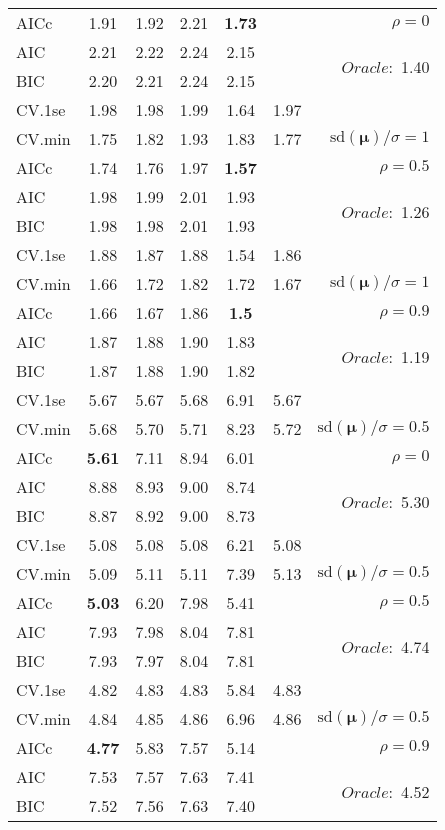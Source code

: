 \begin{table}
\begin{center}
\begin{tabular}{l*{5}{c}|r}
AICc & 1.91 & 1.92 & 2.21 & {\bf 1.73} & & $\rho=0$ \\
AIC & 2.21 & 2.22 & 2.24 & 2.15 & &  \multirow{2}{*}{$Oracle: $ 1.40} \\
BIC & 2.20 & 2.21 & 2.24 & 2.15 & &  \\
 \hline 
CV.1se & 1.98 & 1.98 & 1.99 & 1.64 & 1.97 & \\
CV.min & 1.75 & 1.82 & 1.93 & 1.83 & 1.77 &  $\mathrm{sd}(\mathbf{\mu})/\sigma=1$ \\
AICc & 1.74 & 1.76 & 1.97 & {\bf 1.57} & & $\rho=0.5$ \\
AIC & 1.98 & 1.99 & 2.01 & 1.93 & &  \multirow{2}{*}{$Oracle: $ 1.26} \\
BIC & 1.98 & 1.98 & 2.01 & 1.93 & &  \\
 \hline 
CV.1se & 1.88 & 1.87 & 1.88 & 1.54 & 1.86 & \\
CV.min & 1.66 & 1.72 & 1.82 & 1.72 & 1.67 &  $\mathrm{sd}(\mathbf{\mu})/\sigma=1$ \\
AICc & 1.66 & 1.67 & 1.86 & {\bf 1.5} & & $\rho=0.9$ \\
AIC & 1.87 & 1.88 & 1.90 & 1.83 & &  \multirow{2}{*}{$Oracle: $ 1.19} \\
BIC & 1.87 & 1.88 & 1.90 & 1.82 & &  \\
 \hline 
CV.1se & 5.67 & 5.67 & 5.68 & 6.91 & 5.67 & \\
CV.min & 5.68 & 5.70 & 5.71 & 8.23 & 5.72 &  $\mathrm{sd}(\mathbf{\mu})/\sigma=0.5$ \\
AICc & {\bf 5.61} & 7.11 & 8.94 & 6.01 & & $\rho=0$ \\
AIC & 8.88 & 8.93 & 9.00 & 8.74 & &  \multirow{2}{*}{$Oracle: $ 5.30} \\
BIC & 8.87 & 8.92 & 9.00 & 8.73 & &  \\
 \hline 
CV.1se & 5.08 & 5.08 & 5.08 & 6.21 & 5.08 & \\
CV.min & 5.09 & 5.11 & 5.11 & 7.39 & 5.13 &  $\mathrm{sd}(\mathbf{\mu})/\sigma=0.5$ \\
AICc & {\bf 5.03} & 6.20 & 7.98 & 5.41 & & $\rho=0.5$ \\
AIC & 7.93 & 7.98 & 8.04 & 7.81 & &  \multirow{2}{*}{$Oracle: $ 4.74} \\
BIC & 7.93 & 7.97 & 8.04 & 7.81 & &  \\
 \hline 
CV.1se & 4.82 & 4.83 & 4.83 & 5.84 & 4.83 & \\
CV.min & 4.84 & 4.85 & 4.86 & 6.96 & 4.86 &  $\mathrm{sd}(\mathbf{\mu})/\sigma=0.5$ \\
AICc & {\bf 4.77} & 5.83 & 7.57 & 5.14 & & $\rho=0.9$ \\
AIC & 7.53 & 7.57 & 7.63 & 7.41 & &  \multirow{2}{*}{$Oracle: $ 4.52} \\
BIC & 7.52 & 7.56 & 7.63 & 7.40 & &  \\
 \hline 
\end{tabular}
\end{center}
\vspace{-1cm}
\end{table}





